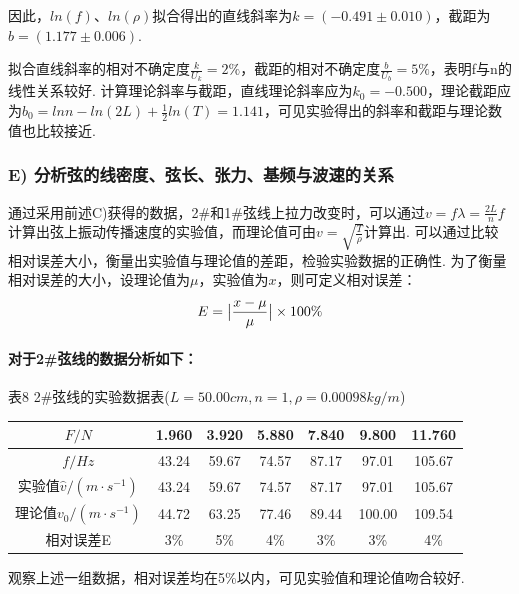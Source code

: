 \documentclass[UTF8]{ctexart}
\begin{document}
因此，$ln(f)$、$ln(\rho)$拟合得出的直线斜率为$k=(-0.491\pm0.010)$，截距为$b=(1.177\pm0.006).$\par
\begin{figure}[H]\centering{}
\end{figure}
拟合直线斜率的相对不确定度$\frac{k}{U_k} = 2\%$，截距的相对不确定度$\frac{b}{U_b} = 5\%$，表明f与n的线性关系较好. 计算理论斜率与截距，直线理论斜率应为$k_0=-0.500$，理论截距应为$b_0=lnn-ln(2L)+\frac{1}{2}ln(T)=1.141$，可见实验得出的斜率和截距与理论数值也比较接近.


\subsubsection*{E) 分析弦的线密度、弦长、张力、基频与波速的关系}
通过采用前述C)获得的数据，2\#和1\#弦线上拉力改变时，可以通过$v=f\lambda=\frac{2L}{n}f$计算出弦上振动传播速度的实验值，而理论值可由$v=\sqrt{\frac{T}{\rho}}$计算出. 可以通过比较相对误差大小，衡量出实验值与理论值的差距，检验实验数据的正确性.
为了衡量相对误差的大小，设理论值为$\mu$，实验值为$x$，则可定义相对误差：
\begin{equation}
E=\big{|}\frac{x-\mu}{\mu}\big{|}\times100\%
\end{equation}\par
\paragraph{对于2\#弦线的数据分析如下：}
\begin{center}
{\kaishu 表8 2\#弦线的实验数据表($L=50.00cm, n=1, \rho=0.00098kg/m$)}
\begin{tabular}{|c|c|c|c|c|c|c|}
\hline
	$F/N$&1.960&3.920&5.880&7.840&9.800&11.760\\
\hline
	$f/Hz$&43.24&59.67&74.57&87.17&97.01&105.67\\
\hline
	实验值$\hat{v}/(m\cdot s^{-1})$&43.24&59.67&74.57&87.17&97.01&105.67\\
\hline
	理论值${v_0}/(m\cdot s^{-1})$&44.72&63.25&77.46&89.44&100.00&109.54\\
\hline
	相对误差E&3\%&5\%&4\%&3\%&3\%&4\%\\
\hline
\end{tabular}\end{center}\par
观察上述一组数据，相对误差均在5\%以内，可见实验值和理论值吻合较好.
\end{document}
